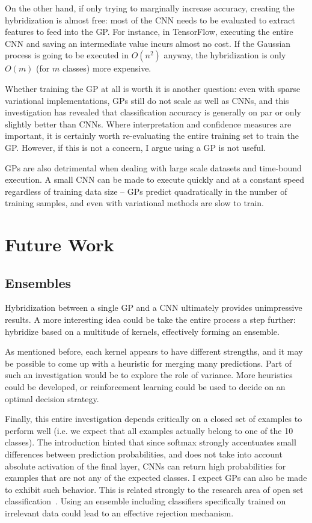\documentclass{article}
\begin{document}
On the other hand, if only trying to marginally increase accuracy, creating the hybridization is almost free: most of the CNN needs to be evaluated to extract features to feed into the GP. For instance, in TensorFlow, executing the entire CNN and saving an intermediate value incurs almost no cost. If the Gaussian process is going to be executed in $O(n^2)$ anyway, the hybridization is only $O(m)$ (for $m$ classes) more expensive.

Whether training the GP at all is worth it is another question: even with sparse variational implementations, GPs still do not scale as well as CNNs, and this investigation has revealed that classification accuracy is generally on par or only slightly better than CNNs. Where interpretation and confidence measures are important, it is certainly worth re-evaluating the entire training set to train the GP. However, if this is not a concern, I argue using a GP is not useful.

GPs are also detrimental when dealing with large scale datasets and time-bound execution. A small CNN can be made to execute quickly and at a constant speed regardless of training data size -- GPs predict quadratically in the number of training samples, and even with variational methods are slow to train.

\section{Future Work}

\subsection{Ensembles}
Hybridization between a single GP and a CNN ultimately provides unimpressive results. A more interesting idea could be take the entire process a step further: hybridize based on a multitude of kernels, effectively forming an ensemble. 

As mentioned before, each kernel appears to have different strengths, and it may be possible to come up with a heuristic for merging many predictions. Part of such an investigation would be to explore the role of variance. More heuristics could be developed, or reinforcement learning could be used to decide on an optimal decision strategy.

Finally, this entire investigation depends critically on a closed set of examples to perform well (i.e. we expect that all examples actually belong to one of the 10 classes). The introduction hinted that since softmax strongly accentuates small differences between prediction probabilities, and does not take into account absolute activation of the final layer, CNNs can return high probabilities for examples that are not any of the expected classes. I expect GPs can also be made to exhibit such behavior. This is related strongly to the research area of open set classification~\cite{scheirer2013toward}. Using an ensemble including classifiers specifically trained on irrelevant data could lead to an effective rejection mechanism.
\end{document}
